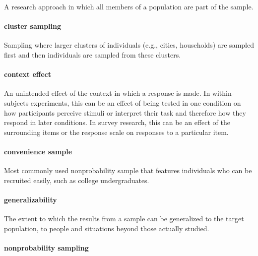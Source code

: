 \documentclass[
]{krantz}
\begin{document}
A research approach in which all members of a population are part of the sample.

\paragraph*{cluster sampling}\label{cluster-sampling}

Sampling where larger clusters of individuals (e.g., cities, households) are sampled first and then individuals are sampled from these clusters.

\paragraph*{context effect}\label{context-effect-1}

An unintended effect of the context in which a response is made. In within-subjects experiments, this can be an effect of being tested in one condition on how participants perceive stimuli or interpret their task and therefore how they respond in later conditions. In survey research, this can be an effect of the surrounding items or the response scale on responses to a particular item.

\paragraph*{convenience sample}\label{convenience-sample}

Most commonly used nonprobability sample that features individuals who can be recruited easily, such as college undergraduates.

\paragraph*{generalizability}\label{generalizability}

The extent to which the results from a sample can be generalized to the target population, to people and situations beyond those actually studied.

\paragraph*{nonprobability sampling}\label{nonprobability-sampling}
\end{document}

